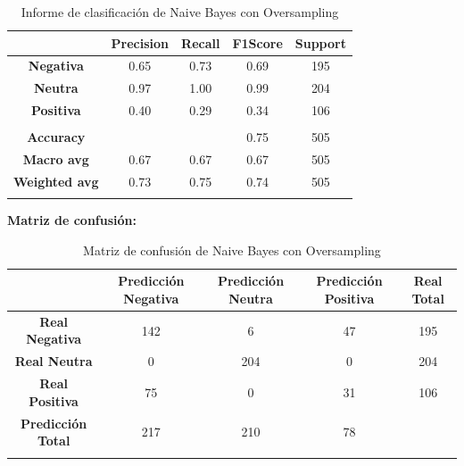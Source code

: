 \documentclass{report}
\begin{document}
{\begin{center}
{                    \begin{longtable}{|c|c|c|c|c|}
                    \hline
                    & \textbf{Precision} & \textbf{Recall} & \textbf{F1Score} & \textbf{Support} \\
                    \hline
                    \textbf{Negativa} & 0.65 & 0.73 & 0.69 & 195 \\
                    \hline
                    \textbf{Neutra} & 0.97 & 1.00 & 0.99 & 204 \\
                    \hline
                    \textbf{Positiva} & 0.40 & 0.29 & 0.34 & 106 \\
                    \hline
                    & \phantom{} & \phantom{} & \phantom{} & \phantom{} \\
                    \hline
                    \textbf{Accuracy} &  &  & 0.75 & 505 \\
                    \hline
                    \textbf{Macro avg} & 0.67 & 0.67 & 0.67 & 505 \\
                    \hline
                    \textbf{Weighted avg} & 0.73 & 0.75 & 0.74 & 505 \\
                    \hline
                    \caption{Informe de clasificación de Naive Bayes con Oversampling}
                    \end{longtable}
            
                    \textbf{Matriz de confusión: }


                    \begin{longtable}{|c|c|c|c|c|}
                    \hline
                     & \textbf{Predicción Negativa} & \textbf{Predicción Neutra} & \textbf{Predicción Positiva} & \textbf{Real Total} \\ \hline
                    \endhead
                    \textbf{Real Negativa} & 142 & 6 & 47 & 195\\ \hline
                    \textbf{Real Neutra} & 0 & 204 & 0 & 204\\ \hline
                    \textbf{Real Positiva} & 75 & 0 & 31 & 106\\ \hline
                    \textbf{Predicción Total} & 217 & 210 & 78 & \\
                    \hline
                    \caption{Matriz de confusión de Naive Bayes con Oversampling}
                    \end{longtable}
                  } 
                  \end{center}
                  

}
\end{document}
